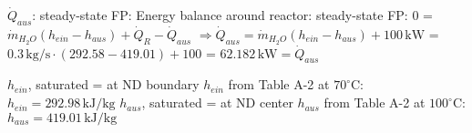 \( \dot{Q}_{aus} \): steady-state FP:  
Energy balance around reactor: steady-state FP:  
0 = \( \dot{m}_{H_2O} (h_{ein} - h_{aus}) + \dot{Q}_R - \dot{Q}_{aus} \)  
\(\Rightarrow \dot{Q}_{aus} = \dot{m}_{H_2O} (h_{ein} - h_{aus}) + 100 \, \text{kW} \)  
= \( 0.3 \, \text{kg/s} \cdot (292.58 - 419.01) + 100 \)  
= \( 62.182 \, \text{kW} = \dot{Q}_{aus} \)  

\( h_{ein} \), saturated = at ND boundary  
\( h_{ein} \) from Table A-2 at \( 70^\circ \text{C} \): \( h_{ein} = 292.98 \, \text{kJ/kg} \)  
\( h_{aus} \), saturated = at ND center  
\( h_{aus} \) from Table A-2 at \( 100^\circ \text{C} \): \( h_{aus} = 419.01 \, \text{kJ/kg} \)